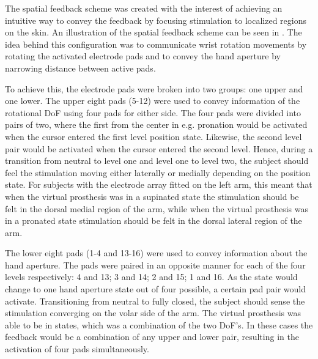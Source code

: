 The spatial feedback scheme was created with the interest of achieving an intuitive way to convey the feedback by focusing stimulation to localized regions on the skin. An illustration of the spatial feedback scheme can be seen in . The idea behind this configuration was to communicate wrist rotation movements by rotating the activated electrode pads and to convey the hand aperture by narrowing distance between active pads. 

To achieve this, the electrode pads were broken into two groups: one upper and one lower. The upper eight pads (5-12) were used to convey information of the rotational DoF using four pads for either side.  The four pads were divided into pairs of two, where the first from the center in e.g. pronation would be activated when the cursor entered the first level position state. Likewise, the second level pair would be activated when the cursor entered the second level. Hence, during a transition from neutral to level one and level one to level two, the subject should feel the stimulation moving either laterally or medially depending on the position state. For subjects with the electrode array fitted on the left arm, this meant that when the virtual prosthesis was in a supinated state the stimulation should be felt in the dorsal medial region of the arm, while when the virtual prosthesis was in a pronated state stimulation should be felt in the dorsal lateral region of the arm.   

The lower eight pads (1-4 and 13-16) were used to convey information about the hand aperture. The pads were paired in an opposite manner for each of the four levels respectively: 4 and 13; 3 and 14; 2 and 15; 1 and 16. As the state would change to one hand aperture state out of four possible, a certain pad pair would activate. Transitioning from neutral to fully closed, the subject should sense the stimulation converging on the volar side of the arm. The virtual prosthesis was able to be in states, which was a combination of the two DoF's. In these cases the feedback would be a combination of any upper and lower pair, resulting in the activation of four pads simultaneously. %

